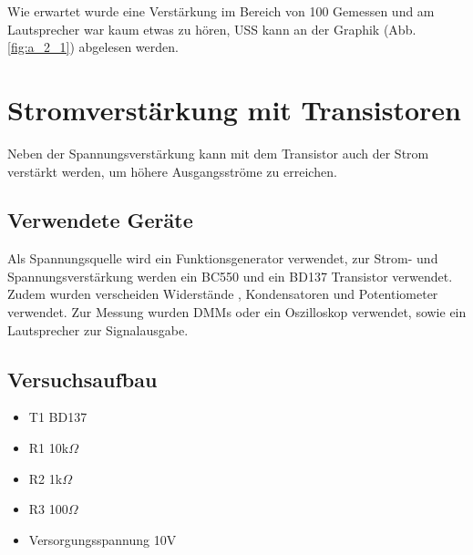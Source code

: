 \documentclass[12pt,a4paper]{article}
\begin{document}
Wie erwartet wurde eine Verstärkung im Bereich von 100 Gemessen und am Lautsprecher war kaum etwas zu hören, USS kann an der Graphik (Abb. \ref{fig:a_2_1}) abgelesen werden. 

\section{Stromverstärkung mit Transistoren}
Neben der Spannungsverstärkung kann mit dem Transistor auch der Strom verstärkt werden, um höhere Ausgangsströme zu erreichen.
\subsection{Verwendete Geräte}
Als Spannungsquelle wird ein Funktionsgenerator verwendet, zur Strom- und Spannungsverstärkung werden ein BC550 und ein BD137 Transistor verwendet. Zudem wurden verscheiden Widerstände , Kondensatoren und Potentiometer verwendet. Zur Messung wurden DMMs oder ein Oszilloskop verwendet, sowie ein Lautsprecher zur Signalausgabe.


\subsection{Versuchsaufbau}

\begin{itemize}
\item	T1 BD137

\item	R1 10k$\Omega$

\item	R2 1k$\Omega$

\item	R3 100$\Omega$

\item	Versorgungsspannung 10V

\end{itemize}
\end{document}
